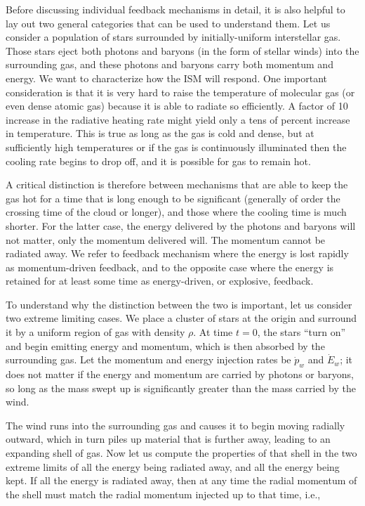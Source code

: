 \documentclass[a4paper,10pt]{article}
\begin{document}
{\noindent}Before discussing individual feedback mechanisms in detail, it is also helpful to lay out two general categories that can be used to understand them. Let us consider a population of stars surrounded by initially-uniform interstellar gas. Those stars eject both photons and baryons (in the form of stellar winds) into the surrounding gas, and these photons and baryons carry both momentum and energy. We want to characterize how the ISM will respond. One important consideration is that it is very hard to raise the temperature of molecular gas (or even dense atomic gas) because it is able to radiate so efficiently. A factor of 10 increase in the radiative heating rate might yield only a tens of percent increase in temperature. This is true as long as the gas is cold and dense, but at sufficiently high temperatures or if the gas is continuously illuminated then the cooling rate begins to drop off, and it is possible for gas to remain hot.

{\noindent}A critical distinction is therefore between mechanisms that are able to keep the gas hot for a time that is long enough to be significant (generally of order the crossing time of the cloud or longer), and those where the cooling time is much shorter. For the latter case, the energy delivered by the photons and baryons will not matter, only the momentum delivered will. The momentum cannot be radiated away. We refer to feedback mechanism where the energy is lost rapidly as momentum-driven feedback, and to the opposite case where the energy is retained for at least some time as energy-driven, or explosive, feedback. 

{\noindent}To understand why the distinction between the two is important, let us consider two extreme limiting cases. We place a cluster of stars at the origin and surround it by a uniform region of gas with density $\rho$. At time $t=0$, the stars ``turn on'' and begin emitting energy and momentum, which is then absorbed by the surrounding gas. Let the momentum and energy injection rates be $\dot{p}_w$ and $\dot{E}_w$; it does not matter if the energy and momentum are carried by photons or baryons, so long as the mass swept up is significantly greater than the mass carried by the wind.

{\noindent}The wind runs into the surrounding gas and causes it to begin moving radially outward, which in turn piles up material that is further away, leading to an expanding shell of gas. Now let us compute the properties of that shell in the two extreme limits of all the energy being radiated away, and all the energy being kept. If all the energy is radiated away, then at any time the radial momentum of the shell must match the radial momentum injected up to that time, i.e.,
\end{document}
